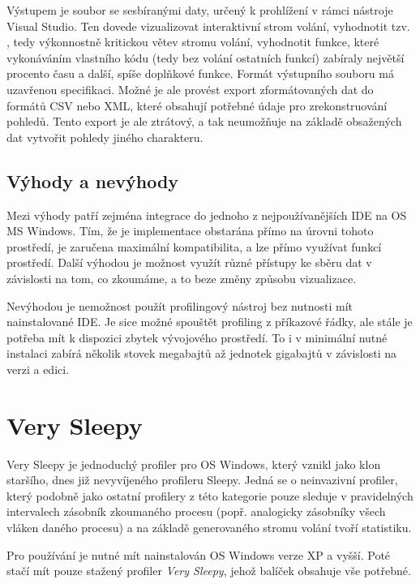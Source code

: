 \documentclass[czech,BP]{thesiskiv}
\begin{document}
Výstupem je soubor se sesbíranými daty, určený k prohlížení v rámci nástroje Visual Studio. Ten dovede vizualizovat interaktivní strom volání, vyhodnotit tzv. , tedy výkonnostně kritickou větev stromu volání, vyhodnotit funkce, které vykonáváním vlastního kódu (tedy bez volání ostatních funkcí) zabíraly největší procento času a další, spíše doplňkové funkce. Formát výstupního souboru má uzavřenou specifikaci. Možné je ale provést export zformátovaných dat do formátů CSV nebo XML, které obsahují potřebné údaje pro zrekonstruování pohledů. Tento export je ale ztrátový, a tak neumožňuje na základě obsažených dat vytvořit pohledy jiného charakteru.

\subsection*{Výhody a nevýhody}

Mezi výhody patří zejména integrace do jednoho z nejpoužívanějších IDE na OS MS Windows. Tím, že je implementace obstarána přímo na úrovni tohoto prostředí, je zaručena maximální kompatibilita, a lze přímo využívat funkcí prostředí. Další výhodou je možnost využít různé přístupy ke sběru dat v závislosti na tom, co zkoumáme, a to beze změny způsobu vizualizace.

Nevýhodou je nemožnost použít profilingový nástroj bez nutnosti mít nainstalované IDE. Je sice možné spouštět profiling z příkazové řádky, ale stále je potřeba mít k dispozici zbytek vývojového prostředí. To i v minimální nutné instalaci zabírá několik stovek megabajtů až jednotek gigabajtů v závislosti na verzi a edici.




\section{Very Sleepy}

Very Sleepy je jednoduchý profiler pro OS Windows, který vznikl jako klon staršího, dnes již nevyvíjeného profileru Sleepy. Jedná se o neinvazivní profiler, který podobně jako ostatní profilery z této kategorie pouze sleduje v pravidelných intervalech zásobník zkoumaného procesu (popř. analogicky zásobníky všech vláken daného procesu) a na základě generovaného stromu volání tvoří statistiku.

Pro používání je nutné mít nainstalován OS Windows verze XP a vyšší. Poté stačí mít pouze stažený profiler \emph{Very Sleepy}, jehož balíček obsahuje vše potřebné.
\end{document}
